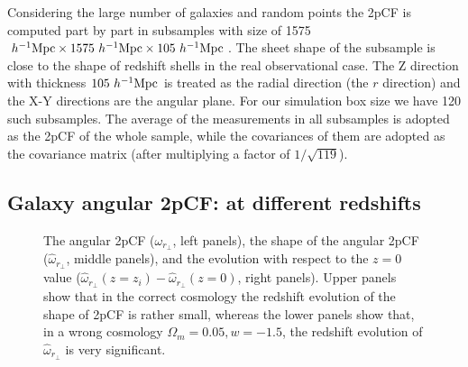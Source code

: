 \documentclass[iop]{emulateapj}
\begin{document}
Considering the large number of galaxies and random points the 2pCF is computed part by part in subsamples with 
size of 1575 $h^{-1}{\rm Mpc}\times 1575\ h^{-1}{\rm Mpc}\times 105\ h^{-1}{\rm Mpc}$.
The sheet shape of the subsample is close to the shape of redshift shells in the real observational case.
The Z direction with thickness $105\ h^{-1}\rm Mpc$ is treated as the radial direction (the $r$ direction) 
and the X-Y directions %
are the angular plane.
For our simulation box size we have 120 such subsamples.
The average of the measurements in all subsamples is adopted as the 2pCF of the whole sample,
while the covariances of them are adopted as the covariance matrix (after multiplying a factor of $1/\sqrt{119}$).


\subsection{Galaxy angular 2pCF: at different redshifts}\label{sec_2pCF_diffz}


\begin{figure}
   \caption{\label{fig_diffz}
  The angular 2pCF ($\omega_{r_\perp}$, left panels), the shape of the angular 2pCF ($\hat{\omega}_{r_\perp}$, middle panels),
  and the evolution with respect to the $z=0$ value ($\hat{\omega}_{r_{\perp}}(z=z_i) - \hat{\omega}_{r_{\perp}}(z=0)$, right panels). 
  Upper panels show that in the correct cosmology the redshift evolution of the shape of 2pCF is rather small, 
  whereas the lower panels show that, in a wrong cosmology $\Omega_m = 0.05,w=-1.5$, the redshift evolution of $\hat{\omega}_{r_\perp}$ is very significant.
   }
\end{figure}
\end{document}

